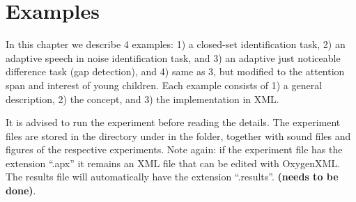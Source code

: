 
\chapter{Examples}
\label{chap:Examples}

In this chapter we describe 4 examples: 1) a closed-set
identification task, 2) an adaptive speech in noise identification
task, and 3) an adaptive just noticeable difference task (gap
detection), and 4) same as 3, but modified to the attention span
and interest of young children. Each example consists of 1) a
general description, 2) the concept, and 3) the implementation in
XML.

It is advised to run the experiment before reading the details.
The experiment files are stored in the \apex directory under
 in the \apex folder, together with
sound files and figures of the respective experiments. Note again:
if the experiment file has the extension ``.apx'' it remains an
XML file that can be edited with OxygenXML. The results file will
automatically have the extension ``.results''. \textbf{(needs to
be done)}.






